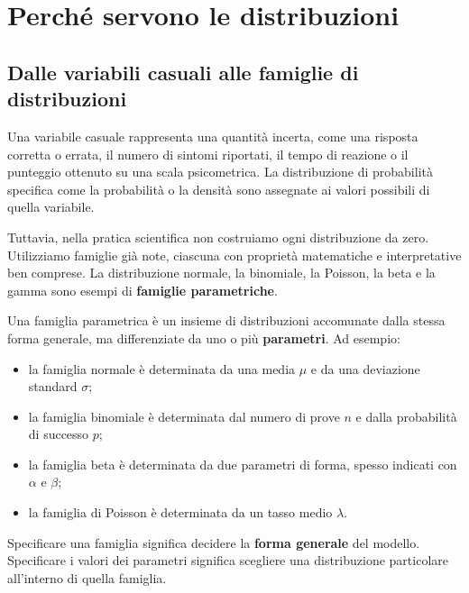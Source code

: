 \documentclass[
  italian,
  letterpaper,
  a4paper,
  11pt,
  open=any]{scrbook}
\providecommand{\tightlist}{%
  \setlength{\itemsep}{0pt}\setlength{\parskip}{0pt}}
\theoremstyle{plain}
\theoremstyle{definition}
\theoremstyle{definition}
\theoremstyle{remark}
\begin{document}
\section{Perché servono le distribuzioni}\label{sec-why-distributions}

\subsection{Dalle variabili casuali alle famiglie di
distribuzioni}\label{dalle-variabili-casuali-alle-famiglie-di-distribuzioni}

Una variabile casuale rappresenta una quantità incerta, come una
risposta corretta o errata, il numero di sintomi riportati, il tempo di
reazione o il punteggio ottenuto su una scala psicometrica. La
distribuzione di probabilità specifica come la probabilità o la densità
sono assegnate ai valori possibili di quella variabile.

Tuttavia, nella pratica scientifica non costruiamo ogni distribuzione da
zero. Utilizziamo famiglie già note, ciascuna con proprietà matematiche
e interpretative ben comprese. La distribuzione normale, la binomiale,
la Poisson, la beta e la gamma sono esempi di \textbf{famiglie
parametriche}.

Una famiglia parametrica è un insieme di distribuzioni accomunate dalla
stessa forma generale, ma differenziate da uno o più \textbf{parametri}.
Ad esempio:

\begin{itemize}
\tightlist
\item
  la famiglia normale è determinata da una media \(\mu\) e da una
  deviazione standard \(\sigma\);
\item
  la famiglia binomiale è determinata dal numero di prove \(n\) e dalla
  probabilità di successo \(p\);
\item
  la famiglia beta è determinata da due parametri di forma, spesso
  indicati con \(\alpha\) e \(\beta\);
\item
  la famiglia di Poisson è determinata da un tasso medio \(\lambda\).
\end{itemize}

Specificare una famiglia significa decidere la \textbf{forma generale}
del modello. Specificare i valori dei parametri significa scegliere una
distribuzione particolare all'interno di quella famiglia.
\end{document}
